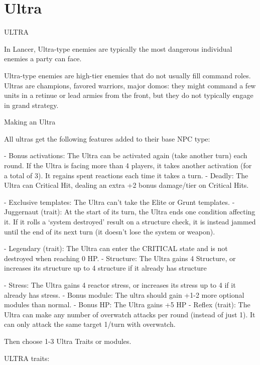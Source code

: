 \section{Ultra}
                                                   ULTRA

In Lancer, Ultra-type enemies are typically the most dangerous individual enemies a party can
face.

Ultra-type enemies are high-tier enemies that do not usually fill command roles. Ultras are
champions, favored warriors, major domos: they might command a few units in a retinue or lead
armies from the front, but they do not typically engage in grand strategy.

Making an Ultra

All ultras get the following features added to their base NPC type:

    -    Bonus activations: The Ultra can be activated again (take another turn) each round. If
        the Ultra is facing more than 4 players, it takes another activation (for a total of 3). It
         regains spent reactions each time it takes a turn.
    -    Deadly: The Ultra can Critical Hit, dealing an extra +2 bonus damage/tier on Critical Hits.

    -    Exclusive templates: The Ultra can’t take the Elite or Grunt templates.
    -   Juggernaut (trait): At the start of its turn, the Ultra ends one condition affecting it. If it
         rolls a ‘system destroyed’ result on a structure check, it is instead jammed until the end of
         its next turn (it doesn’t lose the system or weapon).

    -    Legendary (trait): The Ultra can enter the CRITICAL state and is not destroyed when
         reaching 0 HP.
    -   Structure: The Ultra gains 4 Structure, or increases its structure up to 4 structure if it
         already has structure

    -   Stress: The Ultra gains 4 reactor stress, or increases its stress up to 4 if it already has
        stress.
    -    Bonus module: The ultra should gain +1-2 more optional modules than normal.
    -    Bonus HP: The Ultra gains +5 HP
    -    Reflex (trait): The Ultra can make any number of overwatch attacks per round (instead of
        just 1). It can only attack the same target 1/turn with overwatch.

Then choose 1-3 Ultra Traits or modules.


ULTRA traits:





